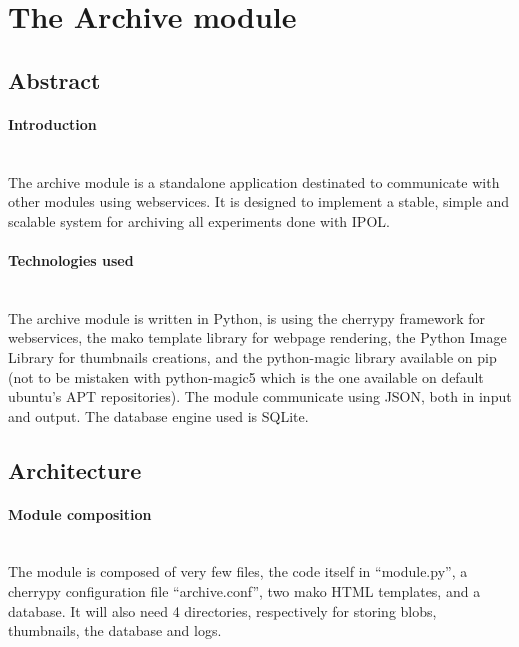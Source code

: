 \section{The Archive module}

\subsection{Abstract}
\label{sec:archive_introduction}

\paragraph{Introduction} \hspace{0pt} \\
The archive module is a standalone application destinated to communicate with other modules using webservices. It is designed to implement a stable, simple and scalable system for archiving all experiments done with IPOL.

\paragraph{Technologies used} \hspace{0pt} \\
The archive module is written in Python, is using the cherrypy framework for webservices, the mako template library for webpage rendering, the Python Image Library for thumbnails creations, and the python-magic library available on pip (not to be mistaken with python-magic5 which is the one available on default ubuntu's APT repositories). The module communicate using JSON, both in input and output. The database engine used is SQLite.

\subsection{Architecture}

\paragraph{Module composition} \hspace{0pt} \\
The module is composed of very few files, the code itself in ``module.py'', a cherrypy configuration file ``archive.conf'', two mako HTML templates, and a database. It will also need 4 directories, respectively for storing blobs, thumbnails, the database and logs.

